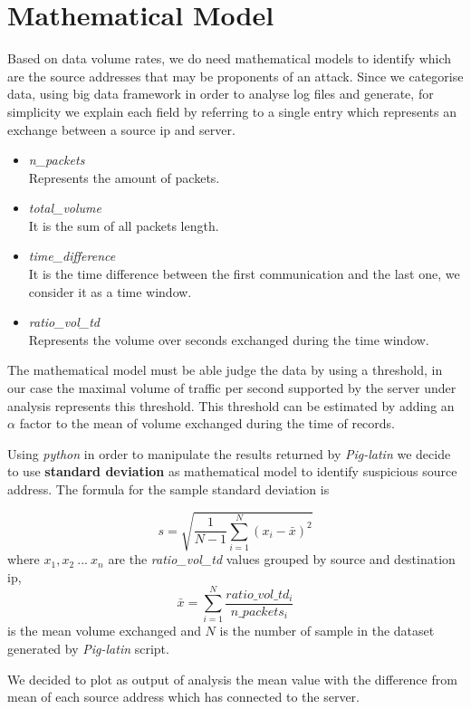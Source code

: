 \section{Mathematical Model}
Based on data volume rates, we do need mathematical models to identify which are the source addresses that may be proponents of an attack. Since we categorise data, using big data framework in order to analyse log files and generate, for simplicity we explain each field by referring to a single entry which represents an exchange between a source ip and server.

\begin{itemize}
	\item \textit{n\_packets} \\ Represents the amount of packets.
	\item \textit{total\_volume} \\ It is the sum of all packets length.
	\item \textit{time\_difference} \\ It is the time difference between the first communication and the last one, we consider it as a time window.
	\item \textit{ratio\_vol\_td} \\ Represents the volume over seconds exchanged during the time window.
\end{itemize}

The mathematical model must be able judge the data \cite{detection_by_path_analaysis} by using a threshold, in our case the maximal volume of traffic per second supported by the server under analysis represents this threshold.
This threshold can be estimated by adding an $\alpha$ factor to the mean of volume exchanged during the time of records.

Using \textit{python} in order to manipulate the results returned by \textit{Pig-latin} we decide to use \textbf{standard deviation} as mathematical model to identify suspicious source address.
The formula for the sample standard deviation is

\begin{equation}
\label{eq:standard_dev}
	s = \sqrt{\frac{1}{N-1}\sum_{i=1}^N(x_i - \bar{x})^2}
\end{equation}
where $x_1, x_2\ ...\ x_n$ are the \textit{ratio\_vol\_td} values grouped by source and destination ip, 
\begin{equation}
	\bar{x}= \sum_{i=1}^N \frac{ratio\_vol\_td_i}{n\_packets_i}
\end{equation}
is the mean volume exchanged and $N$ is the number of sample in the dataset generated by \textit{Pig-latin} script. 

We decided to plot as output of analysis the mean value with the difference from mean of each source address which has connected to the server.
